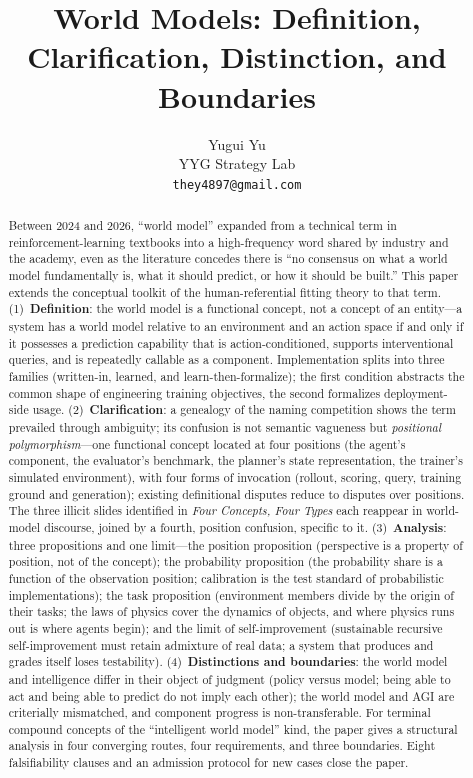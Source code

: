 \documentclass[10pt]{article}
\title{World Models: Definition, Clarification, Distinction, and Boundaries}
\author{Yugui Yu\\ YYG Strategy Lab\\ \texttt{they4897@gmail.com}}
\date{}
\begin{document}
\maketitle

\begin{abstract}
\noindent Between 2024 and 2026, ``world model'' expanded from a technical term in reinforcement-learning textbooks into a high-frequency word shared by industry and the academy, even as the literature concedes there is ``no consensus on what a world model fundamentally is, what it should predict, or how it should be built.'' This paper extends the conceptual toolkit of the human-referential fitting theory to that term. (1)~\textbf{Definition}: the world model is a functional concept, not a concept of an entity---a system has a world model relative to an environment and an action space if and only if it possesses a prediction capability that is action-conditioned, supports interventional queries, and is repeatedly callable as a component. Implementation splits into three families (written-in, learned, and learn-then-formalize); the first condition abstracts the common shape of engineering training objectives, the second formalizes deployment-side usage. (2)~\textbf{Clarification}: a genealogy of the naming competition shows the term prevailed through ambiguity; its confusion is not semantic vagueness but \emph{positional polymorphism}---one functional concept located at four positions (the agent's component, the evaluator's benchmark, the planner's state representation, the trainer's simulated environment), with four forms of invocation (rollout, scoring, query, training ground and generation); existing definitional disputes reduce to disputes over positions. The three illicit slides identified in \emph{Four Concepts, Four Types} each reappear in world-model discourse, joined by a fourth, position confusion, specific to it. (3)~\textbf{Analysis}: three propositions and one limit---the position proposition (perspective is a property of position, not of the concept); the probability proposition (the probability share is a function of the observation position; calibration is the test standard of probabilistic implementations); the task proposition (environment members divide by the origin of their tasks; the laws of physics cover the dynamics of objects, and where physics runs out is where agents begin); and the limit of self-improvement (sustainable recursive self-improvement must retain admixture of real data; a system that produces and grades itself loses testability). (4)~\textbf{Distinctions and boundaries}: the world model and intelligence differ in their object of judgment (policy versus model; being able to act and being able to predict do not imply each other); the world model and AGI are criterially mismatched, and component progress is non-transferable. For terminal compound concepts of the ``intelligent world model'' kind, the paper gives a structural analysis in four converging routes, four requirements, and three boundaries. Eight falsifiability clauses and an admission protocol for new cases close the paper.
\end{abstract}
\end{document}
